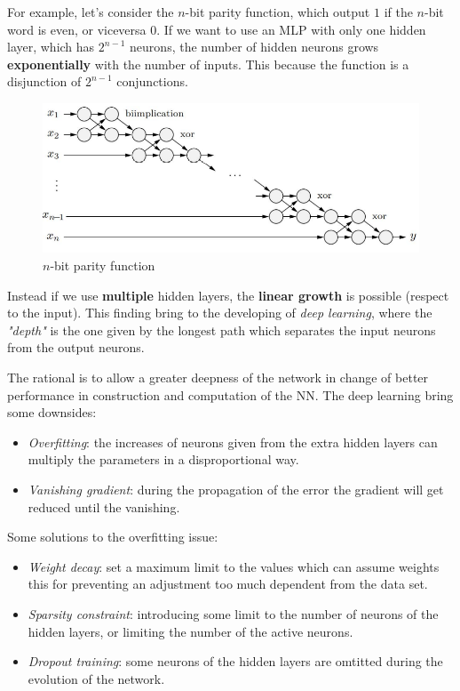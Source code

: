\documentclass{article}
\begin{document}
For example, let's consider the $n$-bit parity function, which output $1$ if the $n$-bit word is even,
or viceversa $0$. If we want to use an MLP with only one hidden layer, which has $2^{n-1}$ neurons, the number
of hidden neurons grows \textbf{exponentially} with the number of inputs. This because the function is a
disjunction of  $2^{n-1}$ conjunctions.
\begin{figure}
    \centering
    \includegraphics[scale=0.5]{images/nbit_parity.png}
    \caption{$n$-bit parity function}
\end{figure}
Instead if we use \textbf{multiple} hidden layers, the \textbf{linear growth} is possible (respect to the
input). This finding bring to the developing of \textit{deep learning}, where the \textit{"depth"} is the
one given by the longest path which separates the input neurons from the output neurons.

The rational is to allow a greater deepness of the network in change of better performance in construction
and computation of the NN. The deep learning bring some downsides:
\begin{itemize}
    \item \textit{Overfitting}: the increases of neurons given from the extra hidden layers can multiply
          the parameters in a disproportional way.
    \item \textit{Vanishing gradient}: during the propagation of the error the gradient will get reduced
          until the vanishing.
\end{itemize}

Some solutions to the overfitting issue:
\begin{itemize}
    \item \textit{Weight decay}: set a maximum limit to the values which can assume weights
          this for preventing an adjustment too much dependent from the data set.
    \item \textit{Sparsity constraint}: introducing some limit to the number of neurons of the
          hidden layers, or limiting the number of the active neurons.
    \item \textit{Dropout training}: some neurons of the hidden layers are omtitted during the
          evolution of the network.
\end{itemize}
\end{document}
